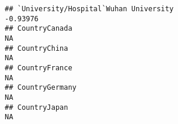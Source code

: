 \documentclass[]{article}
\begin{document}
\begin{verbatim}
## `University/Hospital`Wuhan University                                                                                                                                                                                                                                                                                                                                                                                                                                           -0.93976
## CountryCanada                                                                                                                                                                                                                                                                                                                                                                                                                                                                         NA
## CountryChina                                                                                                                                                                                                                                                                                                                                                                                                                                                                          NA
## CountryFrance                                                                                                                                                                                                                                                                                                                                                                                                                                                                         NA
## CountryGermany                                                                                                                                                                                                                                                                                                                                                                                                                                                                        NA
## CountryJapan                                                                                                                                                                                                                                                                                                                                                                                                                                                                          NA

\end{verbatim}
\end{document}
